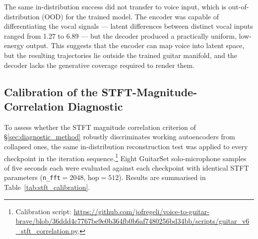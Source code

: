 \documentclass[a4paper,11pt,oneside,openany]{book}
\begin{document}
The same in-distribution success did not transfer to voice input, which is out-of-distribution (OOD) for the trained model. The encoder was capable of differentiating the vocal signals --- latent differences between distinct vocal inputs ranged from 1.27 to 6.89 --- but the decoder produced a practically uniform, low-energy output. This suggests that the encoder can map voice into latent space, but the resulting trajectories lie outside the trained guitar manifold, and the decoder lacks the generative coverage required to render them.

\subsection{Calibration of the STFT-Magnitude-Correlation Diagnostic}\label{sec:stft_calibration}

To assess whether the STFT magnitude correlation criterion of \S\ref{sec:diagnostic_method} robustly discriminates working autoencoders from collapsed ones, the same in-distribution reconstruction test was applied to every checkpoint in the iteration sequence.\footnote{Calibration script: \url{https://github.com/jofregeli/voice-to-guitar-brave/blob/36ddd4c7767be9e0b364fb0b6af7480256bd34bb/scripts/guitar_v6_stft_correlation.py}.} Eight GuitarSet solo-microphone samples of five seconds each were evaluated against each checkpoint with identical STFT parameters (\texttt{n\_fft}$=2048$, hop$=512$). Results are summarised in Table~\ref{tab:stft_calibration}.
\end{document}
